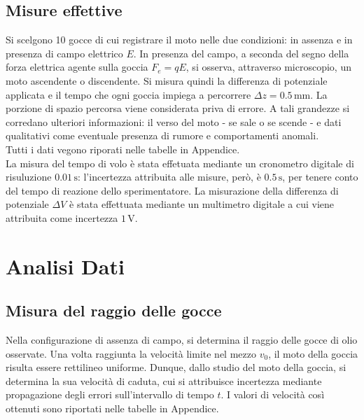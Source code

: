 \documentclass[]{article}
\let\oldsection\section%
\renewcommand{\section}{%
	\renewcommand{\theequation}{\thesection.\arabic{equation}}%
	\oldsection}%
\let\oldsubsection\subsection%
\renewcommand{\subsection}{%
	\renewcommand{\theequation}{\thesubsection.\arabic{equation}}%
	\oldsubsection}%
\begin{document}
    \subsection {Misure effettive}
    Si scelgono 10 gocce di cui registrare il moto nelle due condizioni: in assenza e in presenza di campo elettrico $ E $. In presenza del campo, a seconda del segno della forza elettrica agente sulla goccia $F_e = qE$, si osserva, attraverso microscopio, un moto ascendente o discendente. Si misura quindi la differenza di potenziale applicata e il tempo che ogni goccia impiega a percorrere $ \Delta z = 0.5 \, \text{mm} $. La porzione di spazio percorsa viene considerata priva di errore. A tali grandezze si corredano ulteriori informazioni: il verso del moto - se sale o se scende - e dati qualitativi come eventuale presenza di rumore e comportamenti anomali. \\
    Tutti i dati vegono riporati nelle tabelle in Appendice. \\ 
    La misura del tempo di volo è stata effetuata mediante un cronometro digitale di risuluzione $ 0.01 \, \text{s} $: l'incertezza attribuita alle misure, però, è $0.5 \, \text{s}$, per tenere conto del tempo di reazione dello sperimentatore. La misurazione della differenza di potenziale $ \Delta V $ è stata effettuata mediante un multimetro digitale a cui viene attribuita come incertezza $ 1 \, \text{V} $.


    \section{Analisi Dati}
    \subsection{Misura del raggio delle gocce}
    Nella configurazione di assenza di campo, si determina il raggio delle gocce di olio osservate.
    Una volta raggiunta la velocità limite nel mezzo $v_0$, il moto della goccia risulta essere rettilineo uniforme. Dunque, dallo studio del moto della goccia, si determina la sua velocità di caduta, cui si attribuisce incertezza mediante propagazione degli errori sull'intervallo di tempo $t$. I valori di velocità così ottenuti sono riportati nelle tabelle in Appendice.
\end{document}
